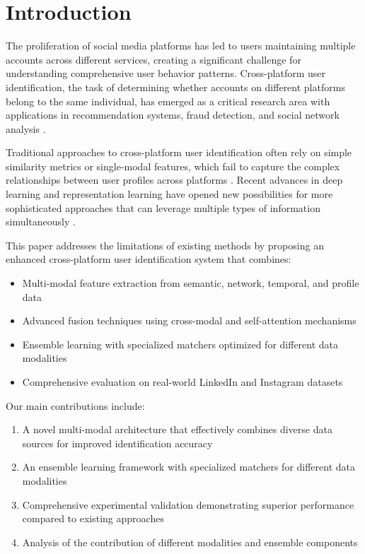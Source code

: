 \documentclass[conference]{IEEEtran}
\begin{document}
\section{Introduction}

The proliferation of social media platforms has led to users maintaining multiple accounts across different services, creating a significant challenge for understanding comprehensive user behavior patterns. Cross-platform user identification, the task of determining whether accounts on different platforms belong to the same individual, has emerged as a critical research area with applications in recommendation systems, fraud detection, and social network analysis \cite{zhang2015cross, liu2016hydra}.

Traditional approaches to cross-platform user identification often rely on simple similarity metrics or single-modal features, which fail to capture the complex relationships between user profiles across platforms \cite{zafarani2009connecting, perito2011we}. Recent advances in deep learning and representation learning have opened new possibilities for more sophisticated approaches that can leverage multiple types of information simultaneously \cite{man2016predict, zhou2018deeplink}.

This paper addresses the limitations of existing methods by proposing an enhanced cross-platform user identification system that combines:
\begin{itemize}
\item Multi-modal feature extraction from semantic, network, temporal, and profile data
\item Advanced fusion techniques using cross-modal and self-attention mechanisms
\item Ensemble learning with specialized matchers optimized for different data modalities
\item Comprehensive evaluation on real-world LinkedIn and Instagram datasets
\end{itemize}

Our main contributions include:
\begin{enumerate}
\item A novel multi-modal architecture that effectively combines diverse data sources for improved identification accuracy
\item An ensemble learning framework with specialized matchers for different data modalities
\item Comprehensive experimental validation demonstrating superior performance compared to existing approaches
\item Analysis of the contribution of different modalities and ensemble components
\end{enumerate}
\end{document}
